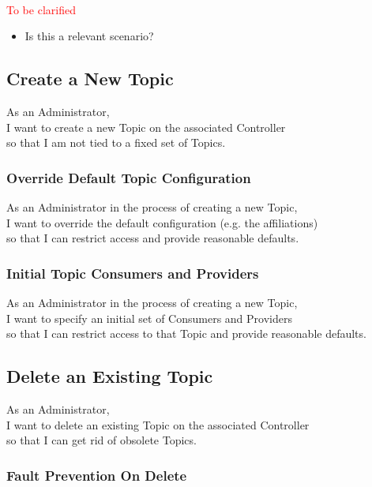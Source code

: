 \noindent\textcolor{red}{\\To be clarified}

\begin{itemize}
    \item Is this a relevant scenario?
\end{itemize}


\subsection{Create a New Topic}

As an Administrator,\\
I want to create a new Topic on the associated Controller\\
so that I am not tied to a fixed set of Topics.

\subsubsection{Override Default Topic Configuration}

As an Administrator in the process of creating a new Topic,\\
I want to override the default configuration (e.g. the affiliations) \\
so that I can restrict access and provide reasonable defaults.

\subsubsection{Initial Topic Consumers and Providers}

As an Administrator in the process of creating a new Topic,\\
I want to specify an initial set of Consumers and Providers \\
so that I can restrict access to that Topic and provide reasonable defaults.

\subsection{Delete an Existing Topic}

As an Administrator,\\
I want to delete an existing Topic on the associated Controller\\
so that I can get rid of obsolete Topics.

\subsubsection{Fault Prevention On Delete}


